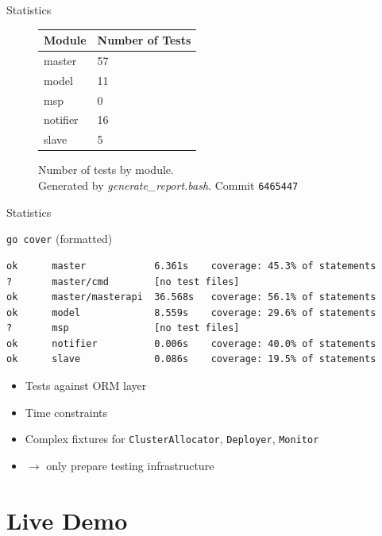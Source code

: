 \documentclass[11pt,aspectratio=169]{beamer}
\begin{document}
    \begin{frame}{Statistics}
        \pause
        \begin{figure}[h]
            \centering
            \begin{tabular}{l|l}
            \toprule
            Module  &  Number of Tests \\
            \midrule
            master & 57 \\
            model & 11 \\
            msp & 0 \\
            notifier & 16 \\
            slave & 5 \\
            \bottomrule
            \end{tabular}
            \caption{Number of tests by module.\\Generated by \textit{generate\_report.bash}. Commit \texttt{6465447}}
        \end{figure}
        
    \end{frame}
    \begin{frame}[fragile]{Statistics}

\texttt{go cover} (formatted)
\begin{verbatim}
ok  	master            6.361s	coverage: 45.3% of statements
?   	master/cmd        [no test files]
ok  	master/masterapi  36.568s	coverage: 56.1% of statements
ok  	model             8.559s	coverage: 29.6% of statements
?   	msp	              [no test files]
ok  	notifier          0.006s	coverage: 40.0% of statements
ok  	slave             0.086s	coverage: 19.5% of statements
\end{verbatim}

\begin{itemize}
    \item Tests against ORM layer
    \item Time constraints
    \item Complex fixtures for \texttt{ClusterAllocator}, \texttt{Deployer}, \texttt{Monitor}
    \item $\rightarrow$ only prepare testing infrastructure
\end{itemize}

\end{frame}
    
    \section{Live Demo}    
    
\end{document}
